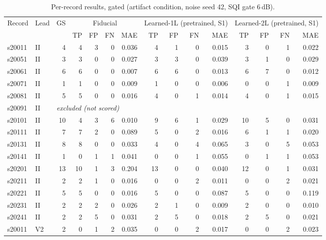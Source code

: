 \begin{table}[htbp]
\centering
\scriptsize
\caption{Per-record results, gated (artifact condition, noise seed 42, SQI gate 6\,dB).}
\label{tab:appendix_per_record}
\begin{tabular}{llrrrrrrrrrrrrr}
\toprule
Record & Lead & GS & \multicolumn{4}{c}{Fiducial} & \multicolumn{4}{c}{Learned-1L (pretrained, S1)} & \multicolumn{4}{c}{Learned-2L (pretrained, S1)} \\
\cmidrule(lr){4-7}\cmidrule(lr){8-11}\cmidrule(lr){12-15}
 & & & TP & FP & FN & MAE & TP & FP & FN & MAE & TP & FP & FN & MAE \\
\midrule
s20011 & II & 4 & 4 & 3 & 0 & 0.036 & 4 & 1 & 0 & 0.015 & 3 & 0 & 1 & 0.022 \\
s20051 & II & 3 & 3 & 0 & 0 & 0.027 & 3 & 3 & 0 & 0.039 & 3 & 1 & 0 & 0.029 \\
s20061 & II & 6 & 6 & 0 & 0 & 0.007 & 6 & 6 & 0 & 0.013 & 6 & 7 & 0 & 0.012 \\
s20071 & II & 1 & 1 & 0 & 0 & 0.009 & 1 & 0 & 0 & 0.006 & 0 & 0 & 1 & 0.009 \\
s20081 & II & 5 & 5 & 0 & 0 & 0.016 & 4 & 0 & 1 & 0.014 & 4 & 0 & 1 & 0.015 \\
s20091 & II & \multicolumn{13}{l}{\textit{excluded (not scored)}} \\
s20101 & II & 10 & 4 & 3 & 6 & 0.010 & 9 & 6 & 1 & 0.029 & 10 & 5 & 0 & 0.031 \\
s20111 & II & 7 & 7 & 2 & 0 & 0.089 & 5 & 0 & 2 & 0.016 & 6 & 1 & 1 & 0.020 \\
s20131 & II & 8 & 8 & 0 & 0 & 0.033 & 4 & 0 & 4 & 0.065 & 3 & 0 & 5 & 0.053 \\
s20141 & II & 1 & 0 & 1 & 1 & 0.041 & 0 & 0 & 1 & 0.055 & 0 & 1 & 1 & 0.053 \\
s20201 & II & 13 & 10 & 1 & 3 & 0.204 & 13 & 0 & 0 & 0.040 & 12 & 0 & 1 & 0.031 \\
s20211 & II & 2 & 2 & 1 & 0 & 0.016 & 0 & 0 & 2 & 0.011 & 0 & 0 & 2 & 0.021 \\
s20221 & II & 5 & 5 & 0 & 0 & 0.016 & 5 & 0 & 0 & 0.087 & 5 & 0 & 0 & 0.119 \\
s20231 & II & 2 & 2 & 2 & 0 & 0.026 & 2 & 1 & 0 & 0.009 & 2 & 0 & 0 & 0.010 \\
s20241 & II & 2 & 2 & 5 & 0 & 0.031 & 2 & 5 & 0 & 0.018 & 2 & 5 & 0 & 0.021 \\
\midrule
s20011 & V2 & 2 & 0 & 1 & 2 & 0.035 & 0 & 0 & 2 & 0.017 & 0 & 0 & 2 & 0.023 \\

\end{tabular}
\end{table}
